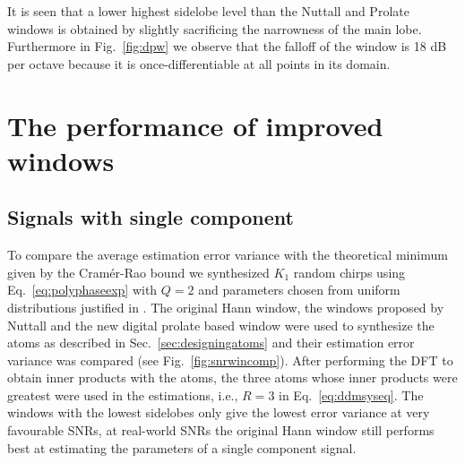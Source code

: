 \documentclass[twoside,a4paper]{article}
\begin{document}
It is seen that a lower highest sidelobe level than the Nuttall and Prolate
windows is obtained by slightly sacrificing the narrowness of the main lobe. Furthermore in
Fig.~\ref{fig:dpw} we observe that the falloff of the window is 18 dB per octave
because it is once-differentiable at all points in its domain.

\section{The performance of improved windows}

\subsection{Signals with single component}

To compare the average estimation error variance with the
theoretical minimum given by the Cram\'{e}r-Rao bound we synthesized $K_{1}$ random
chirps using Eq.~\ref{eq:polyphaseexp}
with $Q=2$ and parameters chosen from uniform distributions justified in
\cite{betser2009sinusoidal}. The original Hann window,
the windows proposed by Nuttall and the new digital prolate based window were
used to synthesize the atoms as described in Sec.~\ref{sec:designingatoms} and
their estimation error variance was compared (see
Fig.~\ref{fig:snrwincomp}). After performing the DFT to obtain inner products
with the atoms, the three atoms whose inner products were greatest were used in
the estimations, i.e., $R=3$ in Eq.~\ref{eq:ddmsyseq}. The windows with the
lowest sidelobes only give the lowest error variance at very favourable SNRs, at
real-world SNRs the original Hann window still performs best at estimating the
parameters of a single component signal.
\end{document}
